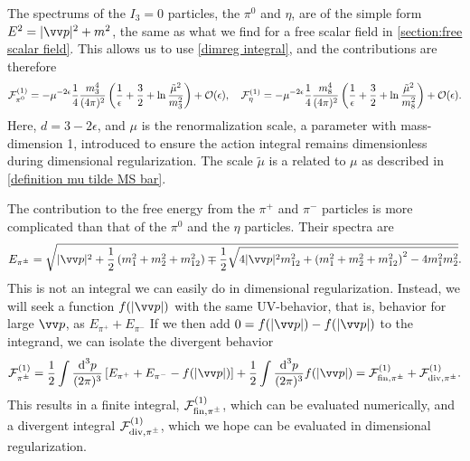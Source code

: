 The spectrums of the $I_3 = 0$ particles, the $\pi^0$ and $\eta$, are of the simple form $E^2 = |\vv p|^2 + m^2$, the same as what we find for a free scalar field in \autoref{section:free scalar field}.
This allows us to use \autoref{dimreg integral}, and the contributions are therefore
%
\begin{equation}
    \label{Free energy pi 0}
    \mathcal{F}^{(1)}_{\pi^0} 
    = 
    - \mu^{-2 \epsilon}  \frac{1}{4} \frac{m_3^4}{(4\pi)^2} 
    \left( \frac{1}{\epsilon} + \frac{3}{2} + \ln \frac{\tilde \mu^2}{m_3^2} \right)
    + \mathcal{O}(\epsilon), \quad
    \mathcal{F}^{(1)}_{\eta}
    = 
    - \mu^{-2 \epsilon}  \frac{1}{4} \frac{m_8^4}{(4\pi)^2} 
    \left( \frac{1}{\epsilon} + \frac{3}{2} + \ln \frac{\tilde \mu^2}{m_8^2} \right)
    + \mathcal{O}(\epsilon).
\end{equation}
%
Here, $d = 3 - 2\epsilon$, and $\mu$ is the renormalization scale, a parameter with mass-dimension 1, introduced to ensure the action integral remains dimensionless during dimensional regularization. The scale $\tilde \mu$ is a related to $\mu$ as described in \autoref{definition mu tilde MS bar}.


The contribution to the free energy from the $\pi^+$ and $\pi^-$ particles is more complicated than that of the $\pi^0$ and the $\eta$ particles.
Their spectra are
%
\begin{equation}
    E_{\pi^\pm}
    = 
    \sqrt{
        |\vv p|^2 +
        \frac{1}{2}
        \left(
            m_1^2 + m_2^2 + m_{12}^2 
        \right)
        \mp 
        \frac{1}{2}
        \sqrt{
            4|\vv p|^2m_{12}^2 
            +
            \left(
                m_1^2 + m_2^2 + m_{12}^2
            \right)^2
            - 4 m_1^2 m_2^2
        }
    }.
\end{equation}
%
This is not an integral we can easily do in dimensional regularization.
Instead, we will seek a function $f(|\vv p|)$ with the same UV-behavior, that is, behavior for large $\vv p$, as $E_{\pi^+} + E_{\pi^-}$
If we then add $0 = f(|\vv p|) - f(|\vv p|)$ to the integrand, we can isolate the divergent behavior
%
\begin{equation}
    \Eff_{\pi^\pm}^{(1)}
    = 
    \frac{1}{2} \int \frac{\dd^3 p}{(2\pi)^3} 
    \left[E_{\pi^+} + E_{\pi^- } - f(|\vv p|)\right]
    + \frac{1}{2} \int \frac{\dd^3 p}{(2\pi)^3} f(|\vv p|)
    = \Eff^{(1)}_{\mathrm{fin}, \pipm } + \Eff^{(1)}_{\mathrm{div}, \pipm}.
\end{equation}
%
This results in a finite integral, $\mathcal{F}^{(1)}_{\mathrm{fin}, {\pi^\pm} }$, which can be evaluated numerically, and a divergent integral $\mathcal{F}^{(1)}_{\mathrm{div}, {\pi^\pm} }$, which we hope can be evaluated in dimensional regularization.

